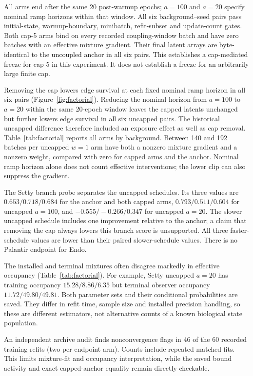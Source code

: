 All arms end after the same 20 post-warmup epochs; $a=100$ and $a=20$ specify nominal ramp horizons within that window. All six background--seed pairs pass initial-state, warmup-boundary,
minibatch, refit-subset and update-count gates. Both cap-5 arms bind on every
recorded coupling-window batch and have zero batches with an effective
mixture gradient. Their final latent arrays are byte-identical to the
uncoupled anchor in all six pairs. This establishes a cap-mediated freeze
for cap 5 in this experiment. It does not establish a freeze for an
arbitrarily large finite cap.

Removing the cap lowers edge survival at each fixed nominal ramp horizon in
all six pairs (Figure~\ref{fig:factorial}). Reducing the nominal horizon from $a=100$ to
$a=20$ within the same 20-epoch window leaves the capped latents unchanged but further lowers edge survival in
all six uncapped pairs. The historical uncapped difference therefore included
an exposure effect as well as cap removal. Table~\ref{tab:factorial} reports
all arms by background. Between 140 and 192 batches per uncapped $w=1$ arm
have both a nonzero mixture gradient and a nonzero weight, compared with
zero for capped arms and the anchor. Nominal ramp horizon alone does not
count effective interventions; the lower clip can also suppress the gradient.

The Setty branch probe separates the uncapped schedules. Its three values
are $0.653/0.718/0.684$ for the anchor and both capped arms,
$0.793/0.511/0.604$ for uncapped $a=100$, and
$-0.555/-0.266/0.347$ for uncapped $a=20$.
The slower uncapped schedule includes one improvement relative to the anchor;
a claim that removing the cap always lowers this branch score is unsupported.
All three faster-schedule values are lower than their paired slower-schedule
values. There is no Palantir endpoint for Endo.

The installed and terminal mixtures often disagree markedly in effective
occupancy (Table~\ref{tab:factorial}). For example, Setty uncapped $a=20$ has training occupancy $15.28/8.86/6.35$ but terminal observer occupancy
$11.72/49.80/49.81$. Both parameter sets and their conditional probabilities
are saved. They differ in refit time, sample size and installed precision
handling, so these are different estimators, not alternative counts of a
known biological state population.

An independent archive audit finds nonconvergence flags in 46 of the 60 recorded training refits (two per endpoint arm). Counts include repeated matched fits. This limits mixture-fit and occupancy interpretation, while the saved bound activity and exact capped-anchor equality remain directly checkable.

